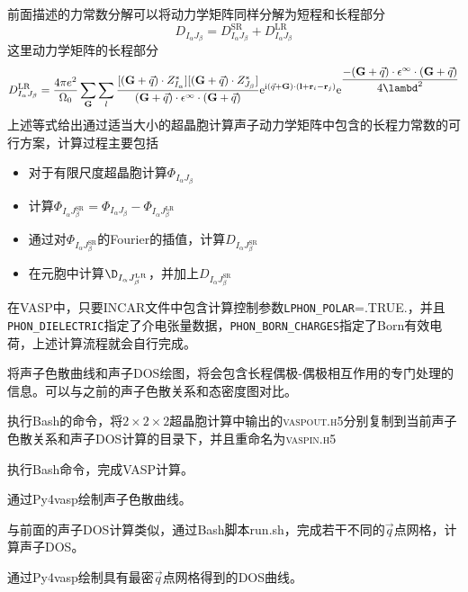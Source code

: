 前面描述的力常数分解可以将动力学矩阵同样分解为短程和长程部分
\begin{displaymath}
	D_{I_{\alpha}J_{\beta}}=D_{I_{\alpha}J_{\beta}}^{\mathrm{SR}}+D_{I_{\alpha}J_{\beta}}^{\mathrm{LR}}
\end{displaymath}
这里动力学矩阵的长程部分
\begin{displaymath}
	D_{I_{\alpha}J_{\beta}}^{\mathrm{LR}}=\dfrac{4\pi e^2}{\Omega_0}\sum_{\mathbf{G}}\sum_l\dfrac{[(\mathbf{G}+\vec q)\cdot Z_{I_{\alpha}}^{\ast}][(\mathbf{G}+\vec q)\cdot Z_{J_{\beta}}^{\ast}]}{(\mathbf{G}+\vec q)\cdot\mathbf{\epsilon}^{\infty}\cdot(\mathbf{G}+\vec q)}\mathrm{e}^{\mathrm{i}(\vec q+\mathbf{G})\cdot(\mathbf{l}+\mathbf{r}_i-\mathbf{r}_j)}\mathrm{e}^{\dfrac{-(\mathbf{G}+\vec q)\cdot\mathbf{\epsilon}^{\infty}\cdot(\mathbf{G}+\vec q)}{4\lambd^2}}
\end{displaymath}
上述等式给出通过适当大小的超晶胞计算声子动力学矩阵中包含的长程力常数的可行方案，计算过程主要包括
\begin{itemize}
	\item 对于有限尺度超晶胞计算$\Phi_{I_{\alpha}J_{\beta}}$
	\item 计算$\Phi_{I_{\alpha}J_{\beta}^{\mathrm{SR}}}=\Phi_{I_{\alpha}J_{\beta}}-\Phi_{I_{\alpha}J_{\beta}^{\mathrm{LR}}}$
	\item 通过对$\Phi_{I_{\alpha}J_{\beta}^{\mathrm{SR}}}$的\textrm{Fourier}的插值，计算$D_{I_{\alpha}J_{\beta}^{\mathrm{SR}}}$
	\item 在元胞中计算$\D_{I_{\alpha}J_{\beta}^{\mathrm{LR}}}$，并加上$D_{I_{\alpha}J_{\beta}^{\mathrm{SR}}}$
\end{itemize}
在\textrm{VASP}中，只要\textrm{INCAR}文件中包含计算控制参数\texttt{LPHON\_POLAR}=\textrm{.TRUE.}，并且\texttt{PHON\_DIELECTRIC}指定了介电张量数据，\texttt{PHON\_BORN\_CHARGES}指定了\textrm{Born}有效电荷，上述计算流程就会自行完成。

将声子色散曲线和声子\textrm{DOS}绘图，将会包含长程偶极-偶极相互作用的专门处理的信息。可以与之前的声子色散关系和态密度图对比。

执行\textrm{Bash}的命令，将$2\times2\times2$超晶胞计算中输出的\textsc{vaspout.h5}分别复制到当前声子色散关系和声子\textrm{DOS}计算的目录下，并且重命名为\textsc{vaspin.h5}

执行\textrm{Bash}命令，完成\textrm{VASP}计算。

通过\textrm{Py4vasp}绘制声子色散曲线。

与前面的声子\textrm{DOS}计算类似，通过\textrm{Bash}脚本\textrm{run.sh}，完成若干不同的$\vec q$点网格，计算声子\textrm{DOS}。

通过\textrm{Py4vasp}绘制具有最密$\vec q$点网格得到的\textrm{DOS}曲线。
